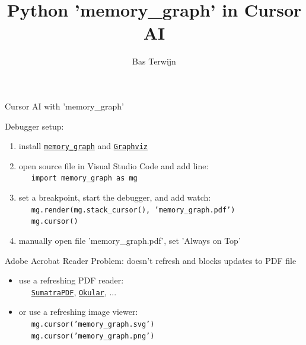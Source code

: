 \documentclass[10pt, colorlinks=true, urlcolor=blue]{beamer}
\title{Python 'memory\_graph' in Cursor AI}
\author{Bas Terwijn}
\date{}
\begin{document}
\begin{frame}
    \titlepage
\end{frame}

\begin{frame}{Cursor AI with 'memory\_graph'}

  Debugger setup:
  \begin{enumerate}
  \item install \href{https://pypi.org/project/memory-graph/}{\texttt{memory\_graph}} and \href{https://graphviz.org/download/}{\texttt{Graphviz}}
  \item open source file in Visual Studio Code and add line: \\
    \ \ \ {\footnotesize \texttt{import memory_graph as mg}}
  \item set a breakpoint, start the debugger, and add watch: \\
    \ \ \ {\footnotesize \texttt{mg.render(mg.stack_cursor(), 'memory_graph.pdf')}} \\
    \ \ \ {\footnotesize \texttt{mg.cursor()}}
  \item manually open file 'memory\_graph.pdf',  set 'Always on Top'
  \end{enumerate}
  
  \vspace{1.8em}
  
  Adobe Acrobat Reader Problem: doesn't refresh and blocks updates to PDF file
  \begin{itemize}
  \item use a refreshing PDF reader: \\ \ \ \
    \href{https://www.sumatrapdfreader.org/}{\texttt{SumatraPDF}},
    \href{https://okular.kde.org/}{\texttt{Okular}}, ...
  \item or use a refreshing image viewer: \\
\ \ \ {\footnotesize \texttt{mg.cursor('memory_graph.svg')}} \\
\ \ \ {\footnotesize \texttt{mg.cursor('memory_graph.png')}}
  \end{itemize}
\end{frame}
\end{document}

